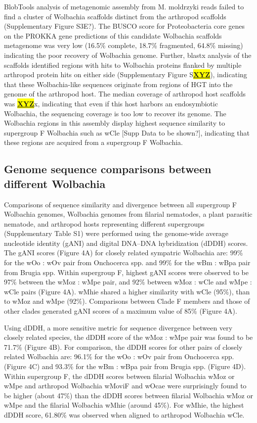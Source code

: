 \documentclass[10pt, a4paper, twocolumn]{article} %
\begin{document}
BlobTools analysis of metagenomic assembly from M. moldrzyki reads failed to find a cluster of Wolbachia scaffolds distinct from the arthropod scaffolds (Supplementary Figure S3E?). The BUSCO score for Proteobacteria core genes on the PROKKA gene predictions of this candidate Wolbachia scaffolds metagenome was very low (16.5\% complete, 18.7\% fragmented, 64.8\% missing) indicating the poor recovery of Wolbachia genome. Further, blastx analysis of the scaffolds identified regions with hits to Wolbachia proteins flanked by multiple arthropod protein hits on either side (Supplementary Figure S\underline{\textbf{\colorbox{Yellow}{XYZ}}}), indicating that these Wolbachia-like sequences originate from regions of HGT into the genome of the arthropod host. The median coverage of arthropod host scaffolds was \underline{\textbf{\colorbox{Yellow}{XYZ}}}x, indicating that even if this host harbors an endosymbiotic Wolbachia, the sequencing coverage is too low to recover its genome. The Wolbachia regions in this assembly display highest sequence similarity to supergroup F Wolbachia such as wCle [Supp Data to be shown?], indicating that these regions are acquired from a supergroup F Wolbachia. 

\subsection{Genome sequence comparisons between different Wolbachia}
Comparisons of sequence similarity and divergence between all supergroup F Wolbachia genomes, Wolbachia genomes from filarial nematodes, a plant parasitic nematode, and arthropod hosts representing different supergroups (Supplementary Table S1) were performed using the genome-wide average nucleotide identity (gANI) and digital DNA–DNA hybridization (dDDH) scores. The gANI scores (Figure 4A) for closely related sympatric Wolbachia are: 99\% for the wOo : wOv pair from Onchocerca spp. and 99\% for the wBm : wBpa pair from Brugia spp. Within supergroup F, highest gANI scores were observed to be 97\% between the wMoz : wMpe pair, and 92\% between wMoz : wCle and wMpe : wCle pairs (Figure 4A). wMhie shared a higher similarity with wCle (95\%), than to wMoz and wMpe (92\%). Comparisons between Clade F members and those of other clades generated gANI scores of a maximum value of 85\% (Figure 4A).

Using dDDH, a more sensitive metric for sequence divergence between very closely related species, the dDDH score of the wMoz : wMpe pair was found to be 71.7\% (Figure 4B). For comparison, the dDDH scores for other pairs of closely related Wolbachia are: 96.1\% for the wOo : wOv pair from Onchocerca spp. (Figure 4C) and 93.3\% for the wBm : wBpa pair from Brugia spp. (Figure 4D). Within supergroup F, the dDDH scores between filarial Wolbachia wMoz or wMpe and arthropod Wolbachia wMoviF and wOcae were surprisingly found to be higher (about 47\%) than the dDDH scores between filarial Wolbachia wMoz or wMpe and the filarial Wolbachia wMhie (around 45\%). For wMhie, the highest dDDH score, 61.80\% was observed when aligned to arthropod Wolbachia wCle.
\end{document}
